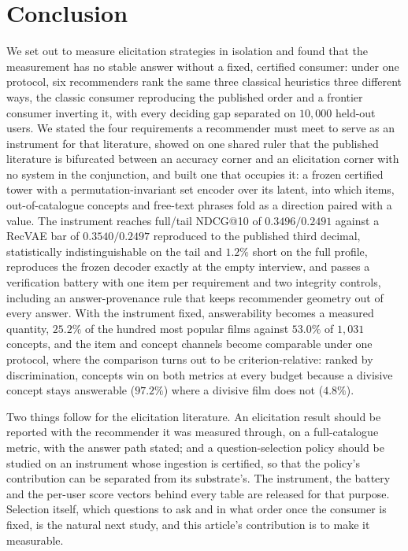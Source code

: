 \documentclass[acmsmall,review,anonymous]{acmart}
\begin{document}
\section{Conclusion}\label{sec:conclusion}

We set out to measure elicitation strategies in isolation and found that the measurement has no stable answer without a fixed, certified consumer: under one protocol, six recommenders rank the same three classical heuristics three different ways, the classic consumer reproducing the published order and a frontier consumer inverting it, with every deciding gap separated on $10{,}000$ held-out users. We stated the four requirements a recommender must meet to serve as an instrument for that literature, showed on one shared ruler that the published literature is bifurcated between an accuracy corner and an elicitation corner with no system in the conjunction, and built one that occupies it: a frozen certified tower with a permutation-invariant set encoder over its latent, into which items, out-of-catalogue concepts and free-text phrases fold as a direction paired with a value. The instrument reaches full/tail NDCG@10 of $0.3496/0.2491$ against a RecVAE bar of $0.3540/0.2497$ reproduced to the published third decimal, statistically indistinguishable on the tail and $1.2\%$ short on the full profile, reproduces the frozen decoder exactly at the empty interview, and passes a verification battery with one item per requirement and two integrity controls, including an answer-provenance rule that keeps recommender geometry out of every answer. With the instrument fixed, answerability becomes a measured quantity, $25.2\%$ of the hundred most popular films against $53.0\%$ of $1{,}031$ concepts, and the item and concept channels become comparable under one protocol, where the comparison turns out to be criterion-relative: ranked by discrimination, concepts win on both metrics at every budget because a divisive concept stays answerable ($97.2\%$) where a divisive film does not ($4.8\%$).

Two things follow for the elicitation literature. An elicitation result should be reported with the recommender it was measured through, on a full-catalogue metric, with the answer path stated; and a question-selection policy should be studied on an instrument whose ingestion is certified, so that the policy's contribution can be separated from its substrate's. The instrument, the battery and the per-user score vectors behind every table are released for that purpose. Selection itself, which questions to ask and in what order once the consumer is fixed, is the natural next study, and this article's contribution is to make it measurable.



\end{document}

